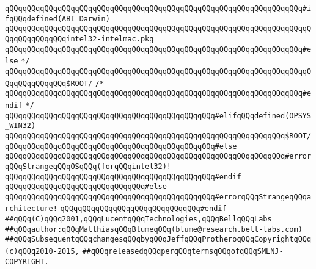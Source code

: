 \verb|qQQqqQQqqQQqqQQqqQQqqQQqqQQqqQQqqQQqqQQqqQQqqQQqqQQqqQQqqQQqqQQqqQQq#ifqQQqdefined(ABI_Darwin)|\newline
\verb|qQQqqQQqqQQqqQQqqQQqqQQqqQQqqQQqqQQqqQQqqQQqqQQqqQQqqQQqqQQqqQQqqQQqqQQqqQQqqQQqqQQqintel32-intelmac.pkg|\newline
\verb|qQQqqQQqqQQqqQQqqQQqqQQqqQQqqQQqqQQqqQQqqQQqqQQqqQQqqQQqqQQqqQQqqQQq#else|\newline
\verb|*/|\newline
\verb|qQQqqQQqqQQqqQQqqQQqqQQqqQQqqQQqqQQqqQQqqQQqqQQqqQQqqQQqqQQqqQQqqQQqqQQqqQQqqQQqqQQq$ROOT/|\newline
\newline
\verb|/*|\newline
\verb|qQQqqQQqqQQqqQQqqQQqqQQqqQQqqQQqqQQqqQQqqQQqqQQqqQQqqQQqqQQqqQQqqQQq#endif|\newline
\verb|*/|\newline
\verb|qQQqqQQqqQQqqQQqqQQqqQQqqQQqqQQqqQQqqQQqqQQqqQQq#elifqQQqdefined(OPSYS_WIN32)|\newline
\newline
\verb|qQQqqQQqqQQqqQQqqQQqqQQqqQQqqQQqqQQqqQQqqQQqqQQqqQQqqQQqqQQqqQQq$ROOT/|\newline
\newline
\verb|qQQqqQQqqQQqqQQqqQQqqQQqqQQqqQQqqQQqqQQqqQQqqQQq#else|\newline
\newline
\verb|qQQqqQQqqQQqqQQqqQQqqQQqqQQqqQQqqQQqqQQqqQQqqQQqqQQqqQQqqQQqqQQq#errorqQQqStrangeqQQqOSqQQq(forqQQqintel32)!|\newline
\newline
\verb|qQQqqQQqqQQqqQQqqQQqqQQqqQQqqQQqqQQqqQQqqQQqqQQq#endif|\newline
\verb|qQQqqQQqqQQqqQQqqQQqqQQqqQQqqQQq#else|\newline
\verb|qQQqqQQqqQQqqQQqqQQqqQQqqQQqqQQqqQQqqQQqqQQqqQQq#errorqQQqStrangeqQQqarchitecture!|\newline
\verb|qQQqqQQqqQQqqQQqqQQqqQQqqQQqqQQq#endif|\newline
\newline
\newline
\verb|##qQQq(C)qQQq2001,qQQqLucentqQQqTechnologies,qQQqBellqQQqLabs|\newline
\verb|##qQQqauthor:qQQqMatthiasqQQqBlumeqQQq(blume@research.bell-labs.com)|\newline
\verb|##qQQqSubsequentqQQqchangesqQQqbyqQQqJeffqQQqProtheroqQQqCopyrightqQQq(c)qQQq2010-2015,|\newline
\verb|##qQQqreleasedqQQqperqQQqtermsqQQqofqQQqSMLNJ-COPYRIGHT.|\newline

